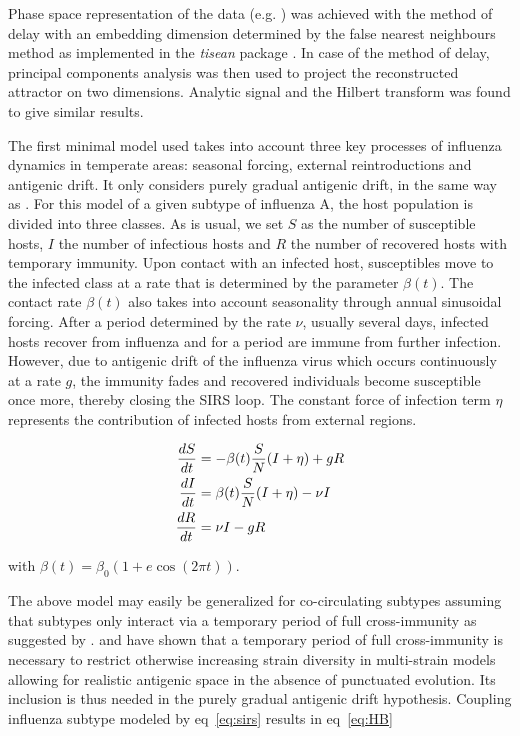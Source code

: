 \documentclass[12pt]{article}
\begin{document}
Phase space representation of the data (e.g. \citet{Kantz2003}) was
achieved with the method of delay with an embedding dimension
determined by the false nearest neighbours method as implemented in
the \textit{tisean} package \citep{Kantz2003}. In case of the method of
delay, principal components analysis was then used to project the
reconstructed attractor on two dimensions.  Analytic signal and the
Hilbert transform was found to give similar results.

The first minimal model used takes into account three key processes of
influenza dynamics in temperate areas: seasonal forcing, external
reintroductions and antigenic drift. It only considers purely gradual
antigenic drift, in the same way as \citet{Pease1987}. For this model
of a given subtype of influenza A, the host population is divided into
three classes. As is usual, we set $S$ as the number of susceptible
hosts, $I$ the number of infectious hosts and $R$ the number of
recovered hosts with temporary immunity. Upon contact with an infected
host, susceptibles move to the infected class at a rate that is
determined by the parameter $\beta(t)$. The contact rate $\beta(t)$
also takes into account seasonality through annual sinusoidal
forcing. After a period determined by the rate $\nu$, usually several
days, infected hosts recover from influenza and for a period are
immune from further infection. However, due to antigenic drift of the
influenza virus which occurs continuously at a rate $g$, the immunity
fades and recovered individuals become susceptible once more, thereby
closing the SIRS loop. The constant force of infection term $\eta$
represents the contribution of infected hosts from external regions.

\begin{footnotesize}
  \begin{align}
    \label{eq:sirs}
    \frac{dS}{dt} &=-\beta(t) \frac{S}{N} (I+\eta) +g R \\
    \frac{dI}{dt} &= \beta(t)  \frac{S}{N} (I+\eta) -\nu I  \notag \\
    \frac{dR}{dt} &= \nu I -g R \notag
  \end{align}
\end{footnotesize}
with $\beta(t)=\beta_0 (1+e \cos(2 \pi t))$.

The above model may easily be generalized for co-circulating subtypes
assuming that subtypes only interact via a temporary period of full
cross-immunity as suggested by
\citet{Webster1992}. \citet{Ferguson2003} and \citet{Tria2005} have
shown that a temporary period of full cross-immunity is necessary to
restrict otherwise increasing strain diversity in multi-strain models
allowing for realistic antigenic space in the absence of punctuated
evolution. Its inclusion is thus needed in the purely gradual
antigenic drift hypothesis. Coupling influenza subtype modeled by
eq~\eqref{eq:sirs} results in eq~\eqref{eq:HB}
\end{document}
